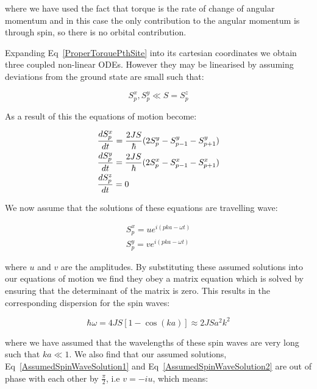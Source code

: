 \noindent where we have used the fact that torque is the rate of change of angular momentum and in this case the only contribution to the angular momentum is through spin, so there is no orbital contribution.

\noindent Expanding Eq~\ref{ProperTorquePthSite} into its cartesian coordinates we obtain three coupled non-linear ODEs. However they may be linearised by assuming deviations from the ground state are small such that:

\begin{equation}
    S_p^x, S_p^y \ll S = S_p^z
    \label{LinearisingConditionSpinWaves}
\end{equation}

\noindent As a result of this the equations of motion become:

\begin{eqnarray}
    \frac{dS_p^x}{dt} = \frac{2JS}{\hbar}(2S_p^y - S_{p - 1}^y - S_{p + 1}^y) \\
    \frac{dS_p^y}{dt} = \frac{2JS}{\hbar}(2S_p^x - S_{p - 1}^x - S_{p + 1}^x) \\
    \frac{dS_p^z}{dt} = 0 \hspace{37.5mm}
\end{eqnarray}

\noindent We now assume that the solutions of these equations are travelling wave:

\begin{eqnarray}
    S_p^x = u e^{i(pka - \omega t)} \label{AssumedSpinWaveSolution1}\\ 
    S_p^y = v e^{i(pka - \omega t)} \label{AssumedSpinWaveSolution2}
\end{eqnarray}

\noindent where $u$ and $v$ are the amplitudes. By substituting these assumed solutions into our equations of motion we find they obey a matrix equation which is solved by ensuring that the determinant of the matrix is zero. This results in the corresponding dispersion for the spin waves:

\begin{equation}
    \hbar \omega = 4JS[1 - \cos(ka)] \approx 2JSa^2k^2
    \label{SpinWavesDispersionRelation}
\end{equation}

\noindent where we have assumed that the wavelengths of these spin waves are very long such that $ka \ll 1$. We also find that our assumed solutions, Eq~\ref{AssumedSpinWaveSolution1} and Eq~\ref{AssumedSpinWaveSolution2} are out of phase with each other by $\frac{\pi}{2}$, i.e $v = -iu$, which means:

